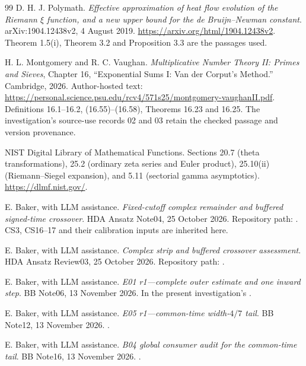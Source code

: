 \begin{thebibliography}{99}
 D. H. J. Polymath.
\emph{Effective approximation of heat flow evolution of the Riemann
$\xi$ function, and a new upper bound for the de Bruijn--Newman constant}.
arXiv:1904.12438v2, 4 August 2019.
\url{https://arxiv.org/html/1904.12438v2}.
Theorem 1.5(i), Theorem 3.2 and Proposition 3.3 are the passages used.

 H. L. Montgomery and R. C. Vaughan.
\emph{Multiplicative Number Theory II: Primes and Sieves}, Chapter 16,
``Exponential Sums I: Van der Corput's Method.'' Cambridge, 2026.
Author-hosted text:
\url{https://personal.science.psu.edu/rcv4/571s25/montgomery-vaughanII.pdf}.
Definitions 16.1--16.2, (16.55)--(16.58), Theorems 16.23 and 16.25.
The investigation's source-use records 02 and 03 retain the checked
passage and version provenance.

 NIST Digital Library of Mathematical Functions.
Sections 20.7 (theta transformations), 25.2 (ordinary zeta series and
Euler product), 25.10(ii) (Riemann--Siegel expansion), and 5.11
(sectorial gamma asymptotics). \url{https://dlmf.nist.gov/}.

 E. Baker, with LLM assistance.
\emph{Fixed-cutoff complex remainder and buffered signed-time crossover}.
HDA Ansatz Note04, 25 October 2026. Repository path:
.
CS3, CS16--17 and their calibration inputs are inherited here.

 E. Baker, with LLM assistance.
\emph{Complex strip and buffered crossover assessment}.
HDA Ansatz Review03, 25 October 2026. Repository path:
.

 E. Baker, with LLM assistance.
\emph{E01 r1---complete outer estimate and one inward step}.
BB Note06, 13 November 2026. In the present investigation's
.

 E. Baker, with LLM assistance.
\emph{E05 r1---common-time width-$4/7$ tail}.
BB Note12, 13 November 2026.
.

 E. Baker, with LLM assistance.
\emph{B04 global consumer audit for the common-time tail}.
BB Note16, 13 November 2026.
.


\end{thebibliography}
